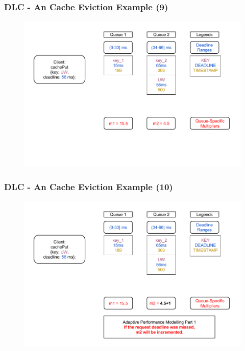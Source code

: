 \documentclass{beamer}
\begin{document}
\begin{frame}
  \frametitle{DLC - An Cache Eviction Example (9)}
  \begin{figure}
    \begin{center}
      \centerline{\includegraphics[scale=0.33]{img/DLC_V5_9.png}}
    \end{center}
  \end{figure}
\end{frame}

\begin{frame}
  \frametitle{DLC - An Cache Eviction Example (10)}
  \begin{figure}
    \begin{center}
      \centerline{\includegraphics[scale=0.33]{img/DLC_V5_10.png}}
    \end{center}
  \end{figure}
\end{frame}
\end{document}
